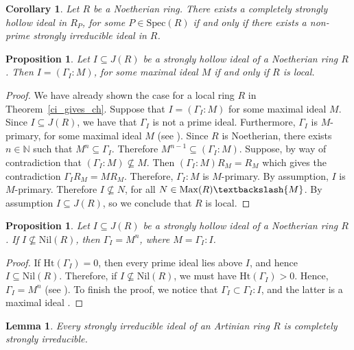 \documentclass[11pt,english]{amsart}
\newtheorem{proposition}[theorem]{Proposition}
\newtheorem{lemma}[theorem]{Lemma}
\newtheorem{corollary}[theorem]{Corollary}
\theoremstyle{definition}
\numberwithin{equation}{section}
\theoremstyle{remark}
\begin{document}
\begin{corollary}
    Let $R$ be a Noetherian ring. There exists a completely strongly hollow ideal in $R_P$, for some $P\in \mathrm{Spec}(R)$ if and only if there exists a non-prime strongly irreducible ideal in $R$. 
\end{corollary}
\begin{proposition}
    Let $I\subseteq J(R)$ be a strongly hollow ideal of a Noetherian ring $R$. Then $I=(\Gamma_I:M)$, for some maximal ideal $M$ if and only if $R$ is local.
\end{proposition}

\begin{proof}
    We have already shown the case for a local ring $R$ in Theorem~\ref{ci_gives_ch}. Suppose that $I=(\Gamma_I:M)$ for some maximal ideal $M$. Since $I\subseteq J(R)$, we have that $\Gamma_I$ is not a prime ideal. Furthermore, $\Gamma_I$ is $M$-primary, for some maximal ideal $M$ (see \cite[Corollary 1.5]{FHO}). Since $R$ is Noetherian, there exists $n\in\mathds{N}$ such that $M^n\subseteq \Gamma_I$. Therefore $M^{n-1}\subseteq (\Gamma_I:M)$. Suppose, by way of contradiction that $(\Gamma_I:M)\not\subseteq M$. Then $(\Gamma_I:M)R_M=R_M$ which gives the contradiction $\Gamma_IR_M=MR_M$. Therefore,  $\Gamma_I:M$ is $M$-primary. By assumption, $I$ is $M$-primary. Therefore $I\not\subseteq N$, for all $N\in\mathrm{Max}(R)\textbackslash\{M\}$. By assumption $I\subseteq J(R)$, so we conclude that $R$ is local. 
\end{proof}

\begin{proposition}
    Let $I\subseteq J(R)$ be a strongly hollow ideal of a Noetherian ring $R$. If $I\not\subseteq \mathrm{Nil}(R)$, then $\Gamma_I=M^n$, where $M=\Gamma_I:I$.
\end{proposition}

\begin{proof}
    If $\mathrm{Ht}(\Gamma_I)=0$, then every prime ideal lies above $I$, and hence $I\subseteq \mathrm{Nil}(R)$. Therefore, if $I\not\subseteq \mathrm{Nil}(R)$, we must have  $\mathrm{Ht}(\Gamma_I)>0$. Hence, $\Gamma_I=M^n$ (see \cite[Theorem.~3.6]{HRR2002}). To finish the proof, we notice that $\Gamma_I\subset \Gamma_I:I$, and the latter is a maximal ideal \cite[Proposition.~1.20]{Rostami2021}.
\end{proof}

\begin{lemma}\label{Art_max_csi}
    Every strongly irreducible ideal of an Artinian ring $R$ is completely strongly irreducible. 
\end{lemma}
\end{document}
